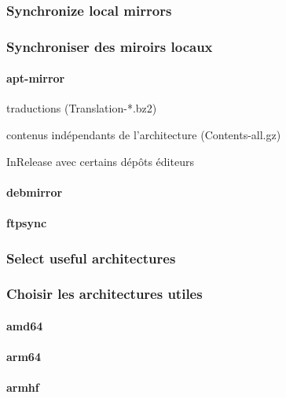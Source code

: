 \ml
{\subsubsection{Synchronize local mirrors}}
{\subsubsection{Synchroniser des miroirs locaux}}

\paragraph{apt-mirror}

\begin{itmz}
\item{
{traductions} (Translation-*.bz2)}
\item{
{contenus indépendants de l’architecture} (Contents-all.gz)}
\item{InRelease 
{avec certains dépôts éditeurs}}
\end{itmz}

\paragraph{debmirror}

\paragraph{ftpsync}

\ml
{\subsubsection{Select useful architectures}}
{\subsubsection{Choisir les architectures utiles}}

\paragraph{amd64}

\paragraph{arm64}

\paragraph{armhf}

